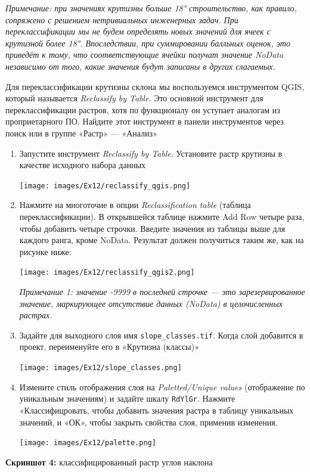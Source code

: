 \documentclass[
  12pt,
]{book}
\begin{document}
\emph{Примечание: при значениях крутизны больше 18° строительство, как правило, сопряжено с решением нетривиальных инженерных задач. При переклассификации мы не будем определять новых значений для ячеек с крутизной более 18°. Впоследствии, при суммировании балльных оценок, это приведёт к тому, что соответствующие ячейки получат значение NoData независимо от того, какие значения будут записаны в других слагаемых.}

Для переклассификации крутизны склона мы воспользуемся инструментом QGIS, который называется \emph{Reclassify by Table}. Это основной инструмент для переклассификации растров, хотя по функционалу он уступает аналогам из проприетарного ПО. Найдите этот инструмент в панели инструментов через поиск или в группе «Растр» --- «Анализ»

\begin{enumerate}
\def\labelenumi{\arabic{enumi}.}
\item
  Запустите инструмент \emph{Reclassify by Table}. Установите растр крутизны в качестве исходного набора данных

  \texttt{[image: images/Ex12/reclassify\_qgis.png]}
\item
  Нажмите на многоточие в опции \emph{Reclassification table} (таблица переклассификации). В открывшейся таблице нажмите Add Row четыре раза, чтобы добавить четыре строчки. Введите значения из таблицы выше для каждого ранга, кроме NoData. Результат должен получиться таким же, как на рисунке ниже:

  \texttt{[image: images/Ex12/reclassify\_qgis2.png]}

  \emph{Примечание 1: значение -9999 в последней строчке --- это зарезервированное значение, маркирующее отсутствие данных (NoData) в целочисленных растрах.}
\item
  Задайте для выходного слоя имя \texttt{slope\_classes.tif}. Когда слой добавится в проект, переименуйте его в «Крутизна (классы)»

  \texttt{[image: images/Ex12/slope\_classes.png]}
\item
  Измените стиль отображения слоя на \emph{Paletted/Unique values} (отображение по уникальным значениям) и задайте шкалу \texttt{RdYlGr}. Нажмите «Классифицровать, чтобы добавить значения растра в таблицу уникальных значений, и «ОК», чтобы закрыть свойства слоя, применив изменения.

  \texttt{[image: images/Ex12/palette.png]}
\end{enumerate}

\textbf{Скриншот 4:} классифицированный растр углов наклона
\end{document}
